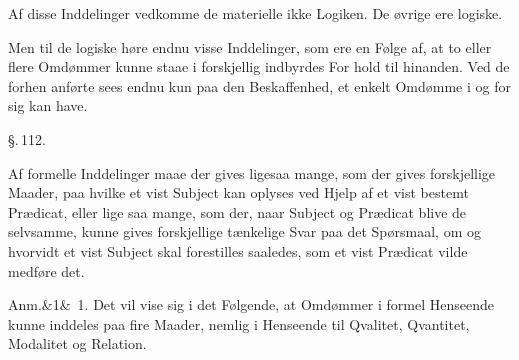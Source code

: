 \documentclass[12pt]{book}
\def\sperr#1{#1}%
\def\textit#1{#1}%
\newcommand{\sperr}[1]{\textls[180]{#1}}
\newcommand{\parag}[1]{%
  \par\vspace{0.9\baselineskip}%
  {\centering\textit{\S.\,#1.}\par}%
  \vspace{0.35\baselineskip}%
  \noindent\hspace{\parindent}\ignorespaces
}
\newcommand{\anm}[1]{%
  \par\vspace{0.5\baselineskip}%
  \noindent\hspace{\parindent}\sperr{Anm.}\ifx&#1&\else~\textit{#1}.\fi
  \enspace\ignorespaces
}
\newcommand{\opage}[1]{\marginnote{\footnotesize\textit{[#1]}}}
\begin{document}
Af disse Inddelinger vedkomme de materielle ikke Logiken. De øvrige ere logiske.

Men til de logiske høre endnu visse Inddelinger, som ere en Følge af, at to eller flere
Omdømmer kunne staae i forskjellig indbyrdes For%
\opage{270}%
hold til hinanden. Ved de forhen anførte sees endnu kun paa den Beskaffenhed, et enkelt
Omdømme i og for sig kan have.

\parag{112}

Af formelle Inddelinger maae der gives ligesaa mange, som der gives forskjellige Maader,
paa hvilke et vist Subject kan oplyses ved Hjelp af et vist bestemt Prædicat, eller lige
saa mange, som der, naar Subject og Prædicat blive de selvsamme, kunne gives forskjellige
tænkelige Svar paa det Spørsmaal, om og hvorvidt et vist Subject skal forestilles saaledes,
som et vist Prædicat vilde medføre det.

\anm{1} Det vil vise sig i det Følgende, at Omdømmer i formel Henseende kunne inddeles paa
fire Maader, nemlig i Henseende til \textit{Qvalitet, Qvantitet, Modalitet og Relation}.
\end{document}
